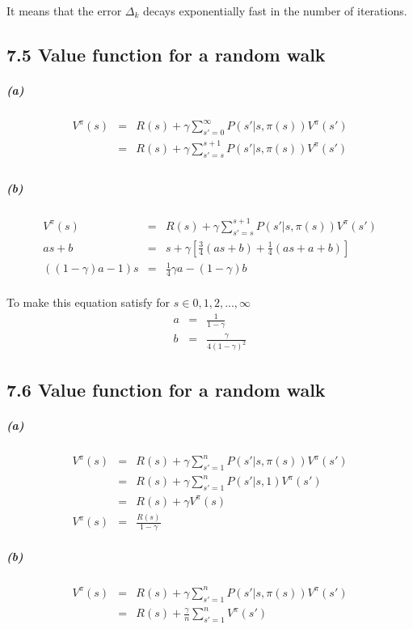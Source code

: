 \documentclass{article}
\begin{document}
It means that the error $\Delta_k$ decays exponentially fast in the number of iterations.

\subsection*{7.5  Value function for a random walk}
\subparagraph*{(a)}
\begin{eqnarray*}
	V^\pi(s) &=& R(s) + \gamma \sum_{s'=0}^{\infty}P(s'|s, \pi(s))V^\pi(s')\\
	&=& R(s) + \gamma \sum_{s'=s}^{s+1}P(s'|s, \pi(s))V^\pi(s')\\
\end{eqnarray*}

\subparagraph*{(b)}
\begin{eqnarray*}
	V^\pi(s) &=& R(s) + \gamma \sum_{s'=s}^{s+1}P(s'|s, \pi(s))V^\pi(s')\\
	as+b &=& s + \gamma [\frac{3}{4}(as+b) + \frac{1}{4}(as+a+b)]\\
	((1-\gamma)a-1) s &=& \frac{1}{4} \gamma a - (1-\gamma)b\\
\end{eqnarray*}

To make this equation satisfy for $s\in{0,1,2,...,\infty}$
\begin{eqnarray*}
	a &=& \frac{1}{1-\gamma}\\
	b &=& \frac{\gamma}{4(1-\gamma)^2}
\end{eqnarray*}

\subsection*{7.6  Value function for a random walk}
\subparagraph*{(a)}
\begin{eqnarray*}
	V^\pi(s) &=& R(s) + \gamma \sum_{s'=1}^{n}P(s'|s, \pi(s))V^\pi(s')\\
	&=& R(s) + \gamma \sum_{s'=1}^{n}P(s'|s, 1)V^\pi(s')\\
	&=& R(s) + \gamma V^\pi(s)\\
	V^\pi(s) &=& \frac{R(s)}{1 - \gamma}
\end{eqnarray*}

\subparagraph*{(b)}
\begin{eqnarray*}
	V^\pi(s) &=& R(s) + \gamma \sum_{s'=1}^{n}P(s'|s, \pi(s))V^\pi(s')\\
	&=& R(s) + \frac{\gamma}{n} \sum_{s'=1}^{n}V^\pi(s')\\
\end{eqnarray*}
\end{document}
